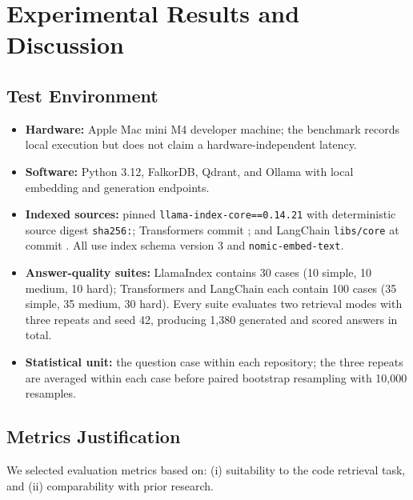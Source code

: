 \documentclass[12pt,letterpaper,oneside]{report}
\begin{document}
\newpage

\chapter{Experimental Results and Discussion}

\section{Test Environment}
\begin{itemize}
    \item \textbf{Hardware:} Apple Mac mini M4 developer machine; the benchmark records local execution but does not claim a hardware-independent latency.
    \item \textbf{Software:} Python 3.12, FalkorDB, Qdrant, and Ollama with local embedding and generation endpoints.
    \item \textbf{Indexed sources:} pinned \texttt{llama-index-core==0.14.21} with deterministic source digest \texttt{sha256:}; Transformers commit \texttt{}; and LangChain \texttt{libs/core} at commit \texttt{}. All use index schema version 3 and \texttt{nomic-embed-text}.
    \item \textbf{Answer-quality suites:} LlamaIndex contains 30 cases (10 simple, 10 medium, 10 hard); Transformers and LangChain each contain 100 cases (35 simple, 35 medium, 30 hard). Every suite evaluates two retrieval modes with three repeats and seed 42, producing 1,380 generated and scored answers in total.
    \item \textbf{Statistical unit:} the question case within each repository; the three repeats are averaged within each case before paired bootstrap resampling with 10,000 resamples.
\end{itemize}

\section{Metrics Justification}
\label{sec:metrics_justification}
We selected evaluation metrics based on: (i) suitability to the code retrieval task, and (ii) comparability with prior research.
\end{document}
